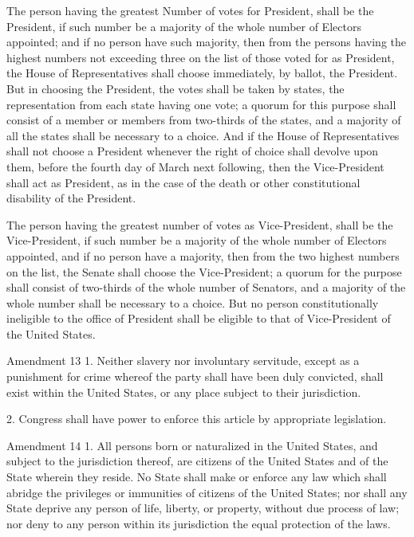 \documentclass[12pt,a4paper]{article}
\begin{document}
The person having the greatest Number of votes for President, shall be the
President, if such number be a majority of the whole number of Electors
appointed; and if no person have such majority, then from the persons having
the highest numbers not exceeding three on the list of those voted for as
President, the House of Representatives shall choose immediately, by ballot,
the President. But in choosing the President, the votes shall be taken by
states, the representation from each state having one vote; a quorum for this
purpose shall consist of a member or members from two-thirds of the states, and
a majority of all the states shall be necessary to a choice. And if the House
of Representatives shall not choose a President whenever the right of choice
shall devolve upon them, before the fourth day of March next following, then
the Vice-President shall act as President, as in the case of the death or other
constitutional disability of the President.

The person having the greatest number of votes as Vice-President, shall be the
Vice-President, if such number be a majority of the whole number of Electors
appointed, and if no person have a majority, then from the two highest numbers
on the list, the Senate shall choose the Vice-President; a quorum for the
purpose shall consist of two-thirds of the whole number of Senators, and a
majority of the whole number shall be necessary to a choice. But no person
constitutionally ineligible to the office of President shall be eligible to
that of Vice-President of the United States.

Amendment 13
1. Neither slavery nor involuntary servitude, except as a punishment for crime
whereof the party shall have been duly convicted, shall exist within the United
States, or any place subject to their jurisdiction.

2. Congress shall have power to enforce this article by appropriate
legislation.

Amendment 14
1. All persons born or naturalized in the United States, and subject to the
jurisdiction thereof, are citizens of the United States and of the State
wherein they reside. No State shall make or enforce any law which shall abridge
the privileges or immunities of citizens of the United States; nor shall any
State deprive any person of life, liberty, or property, without due process of
law; nor deny to any person within its jurisdiction the equal protection of the
laws.
\end{document}
